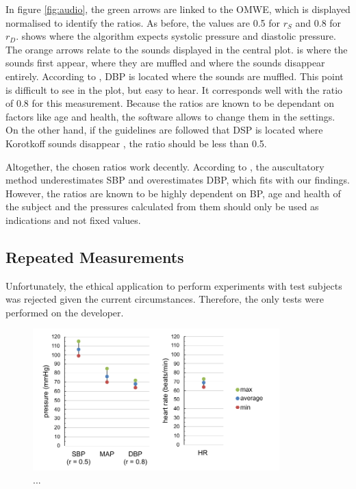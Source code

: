 In figure \ref{fig:audio}, the green arrows are linked to the OMWE, which is displayed normalised to identify the ratios. As before, the values are 0.5 for $r_S$ and 0.8 for $r_D$.  shows where the algorithm expects systolic pressure and  diastolic pressure. The orange arrows relate to the sounds displayed in the central plot.  is where the sounds first appear,  where they are muffled and  where the sounds disappear entirely. According to \cite{Boron2012}, DBP is located where the sounds are muffled. This point is difficult to see in the plot, but easy to hear. It corresponds well with the ratio of 0.8 for this measurement.
Because the ratios are known to be dependant on factors like age and health, the software allows to change them in the settings.  On the other hand, if the guidelines are followed that DSP is located where Korotkoff sounds disappear \citep{Lloyd2018,Reeves1995}, the ratio should be less than 0.5. 



Altogether, the chosen ratios work decently. According to \citet{Sapinski1996}, the auscultatory method underestimates SBP and overestimates DBP, which fits with our findings. However, the ratios are known to be highly dependent on BP, age and health of the subject and the pressures calculated from them should only be used as indications and not fixed values. 

\subsection{Repeated Measurements}
Unfortunately, the ethical application to perform experiments with test subjects was rejected given the current circumstances. Therefore, the only tests were performed on the developer. 

\begin{figure}[ht!]
\centering
\includegraphics[width=0.85\textwidth]{figures/measurements.pdf}
\caption{...}
\label{fig:rep}
\end{figure} 

